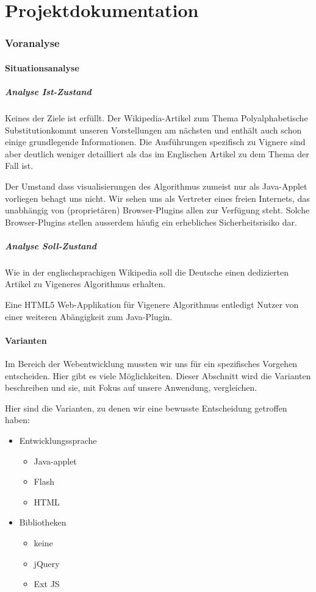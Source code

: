 \documentclass[11pt,paper=a4,final]{scrartcl}
\begin{document}
\part{Projektdokumentation}
\section{Voranalyse}
\label{sec:voranalyse}
\subsection{Situationsanalyse}
\subsubsection{Analyse Ist-Zustand}
Keines der Ziele ist erf\"ullt. Der Wikipedia-Artikel zum Thema \glqq
Polyalphabetische Substitution\grqq kommt unseren Vorstellungen am n\"achsten
und enth\"alt auch schon einige grundlegende Informationen. Die Ausf\"uhrungen
spezifisch zu Vignere sind aber deutlich weniger detailliert als das im
Englischen Artikel zu dem Thema der Fall ist.

Der Umstand dass visualisierungen des Algorithmus zumeist nur als Java-Applet
vorliegen behagt uns nicht. Wir sehen uns als Vertreter eines \glqq freien\grqq
Internets, das unabh\"angig von (propriet\"aren) Browser-Plugins allen zur
Verf\"ugung steht. Solche Browser-Plugins stellen ausserdem h\"aufig ein
erhebliches Sicherheitsrisiko dar.
\subsubsection{Analyse Soll-Zustand}
Wie in der englischsprachigen Wikipedia soll die Deutsche einen dedizierten
Artikel zu Vigeneres Algorithmus erhalten.

Eine HTML5 Web-Applikation f\"ur Vigenere Algorithmus entledigt Nutzer von einer
weiteren Ab\"angigkeit zum Java-Plugin.
\subsection{Varianten}
Im Bereich der Webentwicklung mussten wir uns f\"ur ein spezifisches Vorgehen
entscheiden. Hier gibt es viele M\"oglichkeiten. Dieser Abschnitt wird die
Varianten beschreiben und sie, mit Fokus auf unsere Anwendung, vergleichen.

Hier sind die Varianten, zu denen wir eine bewusste Entscheidung getroffen
haben:
\begin{itemize}
  \item Entwicklungssprache
  \begin{itemize}
    \item Java-applet
    \item Flash
    \item HTML
  \end{itemize}
  \item Bibliotheken
  \begin{itemize}
    \item keine
    \item jQuery
    \item Ext JS
  \end{itemize}
\end{itemize}
\end{document}
